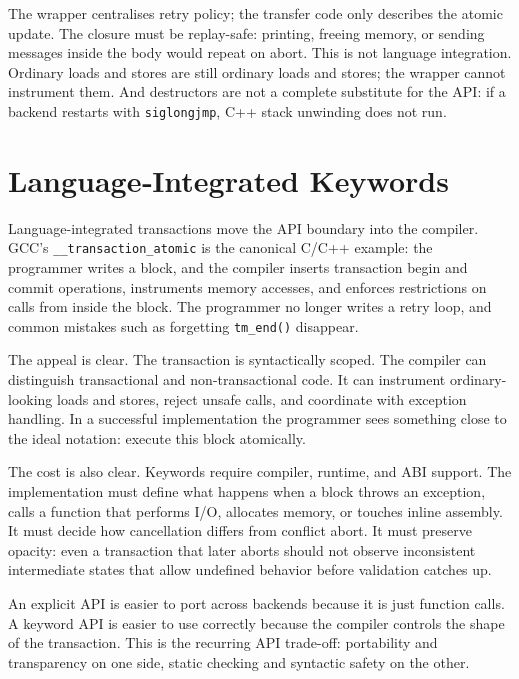 The wrapper centralises retry policy; the transfer code only describes the atomic update. The closure must be replay-safe: printing, freeing memory, or sending messages inside the body would repeat on abort. This is not language integration. Ordinary loads and stores are still ordinary loads and stores; the wrapper cannot instrument them. And destructors are not a complete substitute for the API: if a backend restarts with \texttt{siglongjmp}, C++ stack unwinding does not run.

\section{Language‑Integrated Keywords}

Language-integrated transactions move the API boundary into the compiler. GCC's \texttt{\_\_transaction\_\allowbreak atomic} is the canonical C/C++ example: the programmer writes a block, and the compiler inserts transaction begin and commit operations, instruments memory accesses, and enforces restrictions on calls from inside the block. The programmer no longer writes a retry loop, and common mistakes such as forgetting \texttt{tm\_end()} disappear.

The appeal is clear. The transaction is syntactically scoped. The compiler can distinguish transactional and non-transactional code. It can instrument ordinary-looking loads and stores, reject unsafe calls, and coordinate with exception handling. In a successful implementation the programmer sees something close to the ideal notation: execute this block atomically.

The cost is also clear. Keywords require compiler, runtime, and ABI support. The implementation must define what happens when a block throws an exception, calls a function that performs I/O, allocates memory, or touches inline assembly. It must decide how cancellation differs from conflict abort. It must preserve opacity: even a transaction that later aborts should not observe inconsistent intermediate states that allow undefined behavior before validation catches up.

An explicit API is easier to port across backends because it is just function calls. A keyword API is easier to use correctly because the compiler controls the shape of the transaction. This is the recurring API trade-off: portability and transparency on one side, static checking and syntactic safety on the other.

